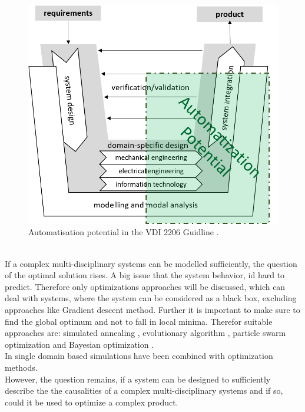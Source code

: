 \begin{figure}[h]
    \centering
    \includegraphics[scale=0.6]{pics/VDI_2206.PNG}
    \caption{\label{pic:VDI2206} Automatisation potential in the VDI 2206 Guidline \cite{Jansch2006THEDO}.}
\end{figure}\\
If a complex multi-disciplinary systems can be modelled sufficiently, the question of the optimal solution rises.
A big issue that the system behavior, id hard to predict.
Therefore only optimizations approaches will be discussed, which can deal with systems,
where the system can be considered as a black box, excluding approaches like Gradient descent method.
Further it is important to make sure to find the global optimum and not to fall in local minima.
Therefor suitable approaches are: simulated annealing \cite{khachaturyan_thermodynamic_1981}, 
evolutionary algorithm \cite{wu_ensemble_2019}, particle swarm optimization \cite{Kennedy1995} and Bayesian optimization \cite{marcuk_optimization_1975}.\\
In \cite{hornby_automated_2006, khalafallah_electimize_2011, evans_aerodynamic_2017, slagter_perform_2020}
single domain based simulations have been combined with optimization methods.\\
However, the question remains, if a system can be designed to sufficiently describe the  
the causalities of a complex multi-disciplinary systems and if so, 
could it be used to optimize a complex product.